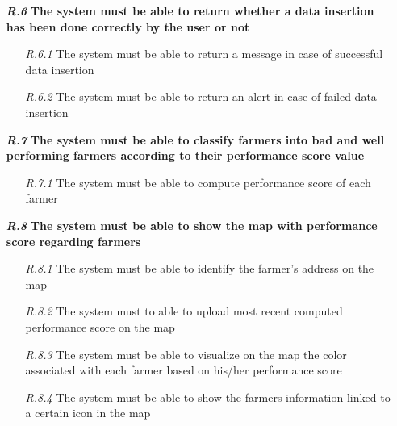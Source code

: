 \begin{itemize}
        \item [\textbf{\textit{R.6}}] \textbf{The system must be able to return whether a data insertion has been done correctly by the user or not}
        \begin{itemize}
            \item [\textit{R.6.1}] The system must be able to return a message in case of successful data insertion
	        \item [\textit{R.6.2}]  The system must be able to return an alert in case of failed data insertion
        \end{itemize}
        \item [\textbf{\textit{R.7}}] \textbf{The system must be able to classify farmers into bad and well performing farmers according to their performance score value }
        \begin{itemize}
            \item [\textit{R.7.1}] The system must be able to compute performance score of each farmer
        \end{itemize}
        
        \item [\textbf{\textit{R.8}}] \textbf{The system must be able to show the map with performance score regarding farmers}
        \begin{itemize}
            \item [\textit{R.8.1}] The system must be able to identify the farmer’s address on the map
	        \item [\textit{R.8.2}] The system must to able to upload most recent computed performance score on the map
	        \item [\textit{R.8.3}] The system must be able to visualize on the map the color associated with each farmer based on his/her performance score
	        \item [\textit{R.8.4}] The system must be able to show the farmers information linked to a certain icon in the map
        \end{itemize}



\end{itemize}
